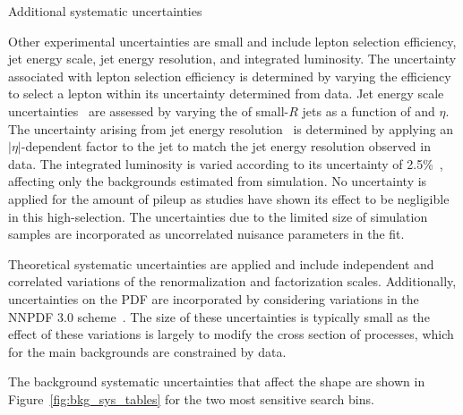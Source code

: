 \begin{section}{Additional systematic uncertainties}

Other experimental uncertainties are small and include lepton selection efficiency, jet energy scale, jet energy resolution, and integrated luminosity.
The uncertainty associated with lepton selection efficiency is determined by varying the efficiency to select a lepton within its uncertainty determined from data.
Jet energy scale uncertainties~\cite{Chatrchyan:2011ds,1748-0221-12-02-P02014} are assessed by varying the \pT of small-$R$ jets as a function of \pT and $\eta$.
The uncertainty arising from jet energy resolution~\cite{Chatrchyan:2011ds,1748-0221-12-02-P02014} is determined by applying an $|\eta|$-dependent factor to the jet \pT to match the jet energy resolution observed in data.
The integrated luminosity is varied according to its uncertainty of 2.5\%~\cite{CMS-PAS-LUM-17-001}, affecting only the backgrounds estimated from simulation.
No uncertainty is applied for the amount of pileup as studies have shown its effect to be negligible in this high-\HT selection.
The uncertainties due to the limited size of simulation samples are incorporated as uncorrelated nuisance parameters in the fit.

Theoretical systematic uncertainties are applied and include independent and correlated variations of the renormalization  and factorization scales.
Additionally, uncertainties on the PDF are incorporated by considering variations in the NNPDF 3.0 scheme~\cite{Ball:2014uwa}.
The size of these uncertainties is typically small as the effect of these variations is largely to modify the cross section of processes, which for the main backgrounds are constrained by data.

The background systematic uncertainties that affect the \Nb shape are shown in Figure~\ref{fig:bkg_sys_tables} for the two most sensitive search bins.


\end{section}
